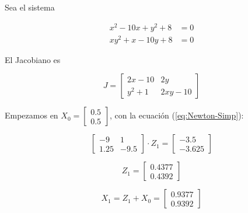 \documentclass{article}
\begin{document}
Sea el sistema

\begin{align*}
    x^2 - 10x + y^2 + 8 &= 0 \\
    xy^2 + x - 10y + 8 &= 0
\end{align*}

El Jacobiano es

\begin{equation*}
    J = \begin{bmatrix}
    2x-10 & 2y \\
    y^2 + 1 & 2xy - 10
    \end{bmatrix}
\end{equation*}

Empezamos en $X_0 = \begin{bmatrix}0.5\\0.5\end{bmatrix}$, con la ecuación (\ref{eq:Newton-Simp}):

\begin{equation*}
    \begin{bmatrix}
    -9 & 1 \\
    1.25 & -9.5
    \end{bmatrix} \cdot Z_{1} = \begin{bmatrix}
    -3.5 \\
    -3.625
    \end{bmatrix}
\end{equation*}

\begin{equation*}
    Z_{1} = \begin{bmatrix}
    0.4377 \\ 0.4392
    \end{bmatrix}
\end{equation*}

\begin{equation*}
    X_1 = Z_1 + X_0 = \begin{bmatrix}
    0.9377 \\
    0.9392
    \end{bmatrix}
\end{equation*}
\end{document}
